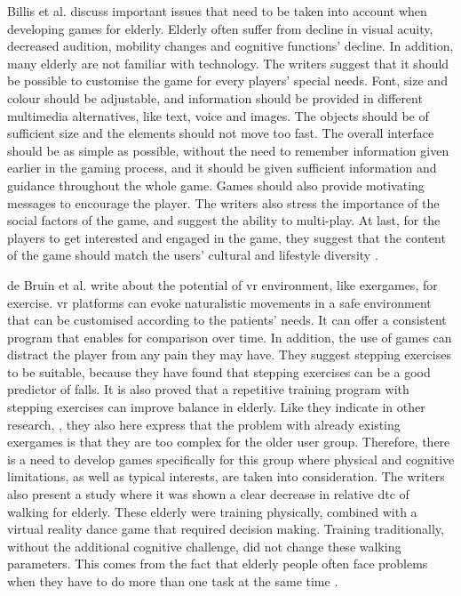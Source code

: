 Billis et al. \cite{Billis} discuss important issues that need to be taken into account when developing games for elderly. Elderly often suffer from decline in visual acuity, decreased audition, mobility changes and cognitive functions' decline. In addition, many elderly are not familiar with technology. The writers suggest that it should be possible to customise the game for every players' special needs. Font, size and colour should be adjustable, and information should be provided in different multimedia alternatives, like text, voice and images. The objects should be of sufficient size and the elements should not move too fast. The overall interface should be as simple as possible, without the need to remember information given earlier in the gaming process, and it should be given sufficient information and guidance throughout the whole game. Games should also provide motivating messages to encourage the player. The writers also stress the importance of the social factors of the game, and suggest the ability to multi-play. At last, for the players to get interested and engaged in the game, they suggest that the content of the game should match the users' cultural and lifestyle diversity \cite{Billis}.

de Bruin et al. \cite{bruin} write about the potential of \ac{vr} environment, like exergames, for exercise. \ac{vr} platforms can evoke naturalistic movements in a safe environment that can be customised according to the patients' needs. It can offer a consistent program that enables for comparison over time. In addition, the use of games can distract the player from any pain they may have. They suggest stepping exercises to be suitable, because they have found that stepping exercises can be a good predictor of falls. It is also proved that a repetitive training program with stepping exercises can improve balance in elderly. Like they indicate in other research, \cite{gerling1} \cite{exergamesforelderly}, they also here express that the problem with already existing exergames is that they are too complex for the older user group. Therefore, there is a need to develop games specifically for this group where physical and cognitive limitations, as well as typical interests, are taken into consideration. The writers also present a study where it was shown a clear decrease in relative \ac{dtc} of walking for elderly. These elderly were training physically, combined with a virtual reality dance game that required decision making. Training traditionally, without the additional cognitive challenge, did not change these walking parameters. This comes from the fact that elderly people often face problems when they have to do more than one task at the same time \cite{bruin}.

